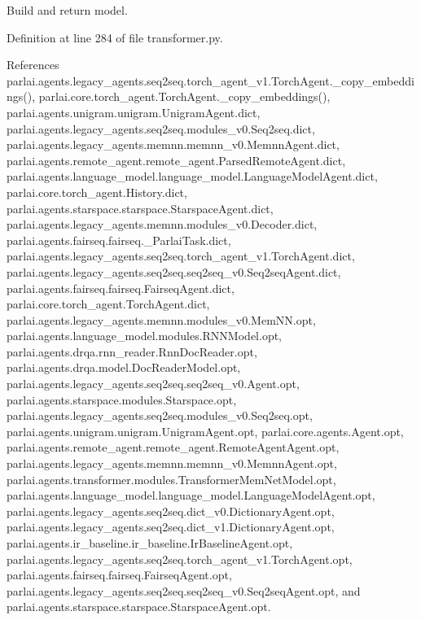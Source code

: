 \begin{DoxyVerb}Build and return model.\end{DoxyVerb}
 

Definition at line 284 of file transformer.\+py.



References parlai.\+agents.\+legacy\+\_\+agents.\+seq2seq.\+torch\+\_\+agent\+\_\+v1.\+Torch\+Agent.\+\_\+copy\+\_\+embeddings(), parlai.\+core.\+torch\+\_\+agent.\+Torch\+Agent.\+\_\+copy\+\_\+embeddings(), parlai.\+agents.\+unigram.\+unigram.\+Unigram\+Agent.\+dict, parlai.\+agents.\+legacy\+\_\+agents.\+seq2seq.\+modules\+\_\+v0.\+Seq2seq.\+dict, parlai.\+agents.\+legacy\+\_\+agents.\+memnn.\+memnn\+\_\+v0.\+Memnn\+Agent.\+dict, parlai.\+agents.\+remote\+\_\+agent.\+remote\+\_\+agent.\+Parsed\+Remote\+Agent.\+dict, parlai.\+agents.\+language\+\_\+model.\+language\+\_\+model.\+Language\+Model\+Agent.\+dict, parlai.\+core.\+torch\+\_\+agent.\+History.\+dict, parlai.\+agents.\+starspace.\+starspace.\+Starspace\+Agent.\+dict, parlai.\+agents.\+legacy\+\_\+agents.\+memnn.\+modules\+\_\+v0.\+Decoder.\+dict, parlai.\+agents.\+fairseq.\+fairseq.\+\_\+\+Parlai\+Task.\+dict, parlai.\+agents.\+legacy\+\_\+agents.\+seq2seq.\+torch\+\_\+agent\+\_\+v1.\+Torch\+Agent.\+dict, parlai.\+agents.\+legacy\+\_\+agents.\+seq2seq.\+seq2seq\+\_\+v0.\+Seq2seq\+Agent.\+dict, parlai.\+agents.\+fairseq.\+fairseq.\+Fairseq\+Agent.\+dict, parlai.\+core.\+torch\+\_\+agent.\+Torch\+Agent.\+dict, parlai.\+agents.\+legacy\+\_\+agents.\+memnn.\+modules\+\_\+v0.\+Mem\+N\+N.\+opt, parlai.\+agents.\+language\+\_\+model.\+modules.\+R\+N\+N\+Model.\+opt, parlai.\+agents.\+drqa.\+rnn\+\_\+reader.\+Rnn\+Doc\+Reader.\+opt, parlai.\+agents.\+drqa.\+model.\+Doc\+Reader\+Model.\+opt, parlai.\+agents.\+legacy\+\_\+agents.\+seq2seq.\+seq2seq\+\_\+v0.\+Agent.\+opt, parlai.\+agents.\+starspace.\+modules.\+Starspace.\+opt, parlai.\+agents.\+legacy\+\_\+agents.\+seq2seq.\+modules\+\_\+v0.\+Seq2seq.\+opt, parlai.\+agents.\+unigram.\+unigram.\+Unigram\+Agent.\+opt, parlai.\+core.\+agents.\+Agent.\+opt, parlai.\+agents.\+remote\+\_\+agent.\+remote\+\_\+agent.\+Remote\+Agent\+Agent.\+opt, parlai.\+agents.\+legacy\+\_\+agents.\+memnn.\+memnn\+\_\+v0.\+Memnn\+Agent.\+opt, parlai.\+agents.\+transformer.\+modules.\+Transformer\+Mem\+Net\+Model.\+opt, parlai.\+agents.\+language\+\_\+model.\+language\+\_\+model.\+Language\+Model\+Agent.\+opt, parlai.\+agents.\+legacy\+\_\+agents.\+seq2seq.\+dict\+\_\+v0.\+Dictionary\+Agent.\+opt, parlai.\+agents.\+legacy\+\_\+agents.\+seq2seq.\+dict\+\_\+v1.\+Dictionary\+Agent.\+opt, parlai.\+agents.\+ir\+\_\+baseline.\+ir\+\_\+baseline.\+Ir\+Baseline\+Agent.\+opt, parlai.\+agents.\+legacy\+\_\+agents.\+seq2seq.\+torch\+\_\+agent\+\_\+v1.\+Torch\+Agent.\+opt, parlai.\+agents.\+fairseq.\+fairseq.\+Fairseq\+Agent.\+opt, parlai.\+agents.\+legacy\+\_\+agents.\+seq2seq.\+seq2seq\+\_\+v0.\+Seq2seq\+Agent.\+opt, and parlai.\+agents.\+starspace.\+starspace.\+Starspace\+Agent.\+opt.

